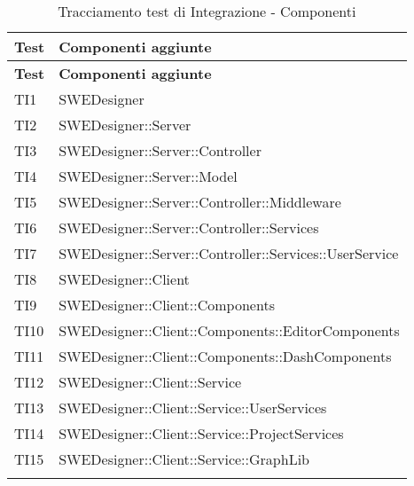\begin{longtable}{p{2cm}!{\VRule[1pt]}p{10cm}}
\color{white} \textbf{Test} & \color{white} \textbf{Componenti aggiunte} \\ 
\endfirsthead 
{} 
\color{white} \textbf{Test} & \color{white} \textbf{Componenti aggiunte} \\ 
\endhead 
TI1 & SWEDesigner \\

TI2 & SWEDesigner::Server\\

TI3 & SWEDesigner::Server::Controller\\

TI4 & SWEDesigner::Server::Model \\

TI5 & SWEDesigner::Server::Controller::Middleware \\

TI6 & SWEDesigner::Server::Controller::Services \\

TI7 & SWEDesigner::Server::Controller::Services::UserService\\

TI8 & SWEDesigner::Client\\

TI9 & SWEDesigner::Client::Components\\

TI10 & SWEDesigner::Client::Components::EditorComponents \\

TI11 & SWEDesigner::Client::Components::DashComponents\\

TI12 & SWEDesigner::Client::Service\\

TI13 & SWEDesigner::Client::Service::UserServices\\

TI14 & SWEDesigner::Client::Service::ProjectServices\\

TI15 & SWEDesigner::Client::Service::GraphLib\\

\caption{Tracciamento test di Integrazione - Componenti}
\end{longtable}



\newpage
